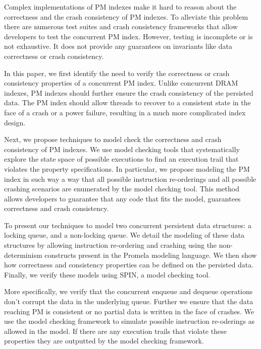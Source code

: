 Complex implementations of PM indexes make it hard to reason about the
correctness and the crash consistency of PM indexes. To alleviate this problem
there are numerous test suites and crash consistency frameworks that allow
developers to test the concurrent PM index. However, testing is incomplete or
is not exhaustive. It does not provide any guarantees on invariants like
data correctness or crash consistency.

In this paper, we first
identify the need to verify the correctness or crash consistency properties
of a concurrent PM index. Unlike concurrent DRAM indexes, PM indexes should
further ensure the crash consistency of the persisted data. The PM index
should allow threads to recover to a consistent state in the face of a crash or
a power failure, resulting in a much more complicated index design.

Next,
we propose techniques to model check the correctness and crash consistency of
PM indexes. We use model checking tools that systematically explore the state
space of possible executions to find an execution trail that violates the
property specifications. In particular, we propose modeling the PM index in
such way a way that all possible instruction re-orderings and all possible
crashing scenarios are enumerated by the model checking tool. This method
allows developers to guarantee that any code that fits the model, guarantees
correctness and crash consistency.

To present our techniques to model two concurrent persistent data structures:
a locking queue, and a non-locking queue. We detail the modeling of these data
structures by allowing instruction re-ordering and crashing using the
non-determinism constructs present in the Promela modeling language. We then
show how correctness and consistency properties can be defined on the persisted
data. Finally, we verify these models using SPIN, a model checking tool.

More specifically, we verify that the concurrent enqueue and dequeue operations
don't corrupt the data in the underlying queue. Further we ensure that the data
reaching PM is consistent or no partial data is written in the face of crashes.
We use the model checking framework to simulate possible instruction re-oderings
as allowed in the model. If there are any execution trails that violate these
properties they are outputted by the model checking framework.

